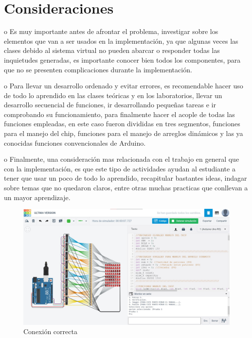 \documentclass{article}
\begin{document}
\section{Consideraciones} \label{contenido}
o	Es muy importante antes de afrontar el problema, investigar sobre los elementos que van a ser usados en la implementación, ya que algunas veces las clases debido al sistema virtual no pueden abarcar o responder todas las inquietudes generadas, es importante conocer bien todos los componentes, para que no se presenten complicaciones durante la implementación.\par
o	Para llevar un desarrollo ordenado y evitar errores, es recomendable hacer uso de todo lo aprendido en las clases teóricas y en los laboratorios, llevar un desarrollo secuencial de funciones, ir desarrollando pequeñas tareas e ir comprobando su funcionamiento, para finalmente hacer el acople de todas las funciones empleadas, en este caso fueron divididas en tres segmentos, funciones para el manejo del chip, funciones para el manejo de arreglos dinámicos y las ya conocidas funciones convencionales de Arduino.\par
o	Finalmente, una consideración mas relacionada con el trabajo en general que con la implementación, es que este tipo de actividades ayudan al estudiante a tener que usar un poco de todo lo aprendido, recapitular bastantes ideas, indagar sobre temas que no quedaron claros, entre otras muchas practicas que conllevan a un mayor aprendizaje.\par

\begin{figure}[H]
\includegraphics[width=12cm]{Montaje finalizado.jpg}
\centering
\caption{Conexión correcta}
\label{fig:conexion}
\end{figure}
\end{document}
